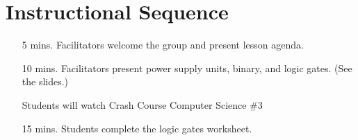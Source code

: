 \documentclass[11pt]{article}
\begin{document}
\section*{Instructional Sequence}

\begin{itemize}
  \item[5 mins.]
    Facilitators welcome the group and present lesson agenda.

  \item[10 mins.]
    Facilitators present power supply units, binary, and logic gates.
    (See the slides.)

    Students will watch Crash Course Computer Science \#3

  \item[15 mins.]
    Students complete the logic gates worksheet.

\end{itemize}
\end{document}
